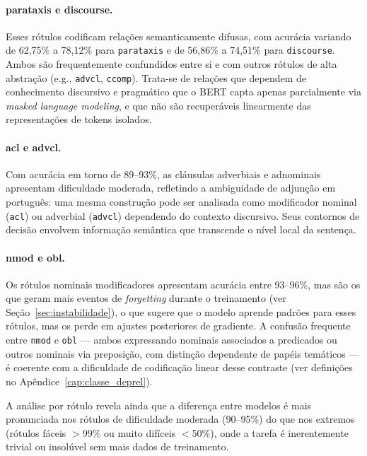 \paragraph{parataxis e discourse.} Esses rótulos codificam relações semanticamente difusas,
com acurácia variando de 62,75\% a 78,12\% para \texttt{parataxis} e de 56,86\% a 74,51\% para
\texttt{discourse}. Ambos são frequentemente confundidos entre si e com outros rótulos de alta
abstração (e.g., \texttt{advcl}, \texttt{ccomp}). Trata-se de relações que dependem de
conhecimento discursivo e pragmático que o BERT capta apenas parcialmente via \textit{masked
language modeling}, e que não são recuperáveis linearmente das representações de tokens isolados.

\paragraph{acl e advcl.} Com acurácia em torno de 89--93\%, as cláusulas adverbiais e
adnominais apresentam dificuldade moderada, refletindo a ambiguidade de adjunção em português:
uma mesma construção pode ser analisada como modificador nominal (\texttt{acl}) ou adverbial
(\texttt{advcl}) dependendo do contexto discursivo. Seus contornos de decisão envolvem
informação semântica que transcende o nível local da sentença.

\paragraph{nmod e obl.} Os rótulos nominais modificadores apresentam acurácia entre
93--96\%, mas são os que geram mais eventos de \textit{forgetting} durante o treinamento (ver
Seção~\ref{sec:instabilidade}), o que sugere que o modelo aprende padrões para esses rótulos,
mas os perde em ajustes posteriores de gradiente. A confusão frequente entre \texttt{nmod} e
\texttt{obl} — ambos expressando nominais associados a predicados ou outros nominais via
preposição, com distinção dependente de papéis temáticos — é coerente com a dificuldade de
codificação linear desse contraste (ver definições no Apêndice~\ref{cap:classe_deprel}).

A análise por rótulo revela ainda que a diferença entre modelos é mais pronunciada nos rótulos
de dificuldade moderada (90--95\%) do que nos extremos (rótulos fáceis $>$99\% ou muito
difíceis $<$50\%), onde a tarefa é inerentemente trivial ou insolúvel sem mais dados de
treinamento.

